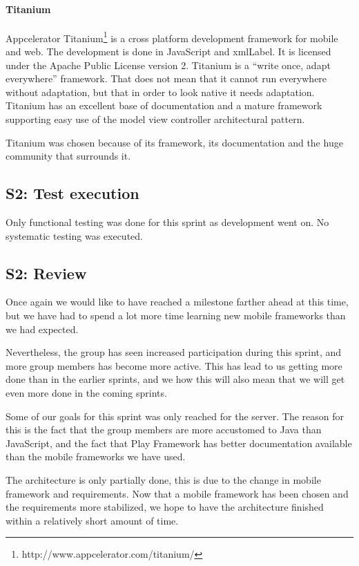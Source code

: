\documentclass[11pt]{book}
\begin{document}
\paragraph{Titanium}
Appcelerator Titanium\footnote{http://www.appcelerator.com/titanium/} is a cross platform development framework for mobile and web. The development is done in JavaScript and \gls{xmlLabel}. It is licensed under the Apache Public License version 2. Titanium is a ``write once, adapt everywhere'' framework\cite{titaniumCrossMobile}. That does not mean that it cannot run everywhere without adaptation, but that in order to look native it needs adaptation. Titanium has an excellent base of documentation and a mature framework supporting easy use of the model view controller architectural pattern.

Titanium was chosen because of its framework, its documentation and the huge community that surrounds it.


\subsection{S2: Test execution}
Only functional testing was done for this sprint as development went on. No systematic testing was executed.

\subsection{S2: Review}
Once again we would like to have reached a milestone farther ahead at this time, but we have had to spend a lot more time learning new mobile frameworks than we had expected. 

Nevertheless, the group has seen increased participation during this sprint, and more group members has become more active. This has lead to us getting more done than in the earlier sprints, and we how this will also mean that we will get even more done in the coming sprints.

Some of our goals for this sprint was only reached for the server. The reason for this is the fact that the group members are more accustomed to Java than JavaScript, and the fact that Play Framework has better documentation available than the mobile frameworks we have used.

The architecture is only partially done, this is due to the change in mobile framework and requirements. Now that a mobile framework has been chosen and the requirements more stabilized, we hope to have the architecture finished within a relatively short amount of time.
\end{document}
